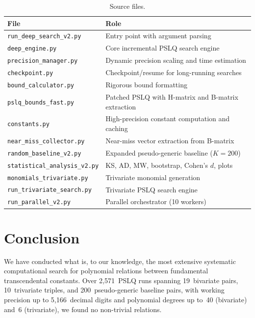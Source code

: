 \documentclass[11pt]{amsart}
\theoremstyle{remark}
\begin{document}
\begin{table}[ht]
\centering
\caption{Source files.}\label{tab:source}
\begin{tabular}{@{}ll@{}}
\toprule
File & Role \\
\midrule
\texttt{run\_deep\_search\_v2.py} & Entry point with argument parsing \\
\texttt{deep\_engine.py}          & Core incremental PSLQ search engine \\
\texttt{precision\_manager.py}    & Dynamic precision scaling and time estimation \\
\texttt{checkpoint.py}            & Checkpoint/resume for long-running searches \\
\texttt{bound\_calculator.py}     & Rigorous bound formatting \\
\texttt{pslq\_bounds\_fast.py}   & Patched PSLQ with H-matrix and B-matrix extraction \\
\texttt{constants.py}             & High-precision constant computation and caching \\
\texttt{near\_miss\_collector.py} & Near-miss vector extraction from B-matrix \\
\texttt{random\_baseline\_v2.py}   & Expanded pseudo-generic baseline ($K{=}200$) \\
\texttt{statistical\_analysis\_v2.py} & KS, AD, MW, bootstrap, Cohen's $d$, plots \\
\texttt{monomials\_trivariate.py} & Trivariate monomial generation \\
\texttt{run\_trivariate\_search.py} & Trivariate PSLQ search engine \\
\texttt{run\_parallel\_v2.py}     & Parallel orchestrator (10 workers) \\
\bottomrule
\end{tabular}
\end{table}

\section{Conclusion}\label{sec:conclusion}

We have conducted what is, to our knowledge, the most extensive systematic
computational search for polynomial relations between fundamental
transcendental constants. Over 2{,}571~PSLQ runs spanning 19~bivariate pairs,
10~trivariate triples, and 200~pseudo-generic baseline pairs, with working
precision up to 5{,}166~decimal digits and polynomial degrees up to~40
(bivariate) and~6 (trivariate), we found no non-trivial relations.
\end{document}
